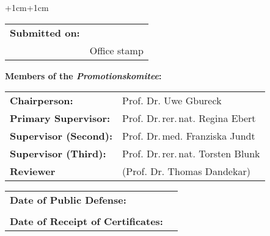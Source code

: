 


\vspace*{\fill} %

\thispagestyle{empty} %

\begin{adjustwidth}{+1cm}{+1cm} %

    \noindent
    \begin{tabular}{l l}
        \textbf{Submitted on:} & \dotuline{\hspace{10cm}} \\
                               & {\small Office stamp}    \\
    \end{tabular}


    \vspace{\vdouble}
    {\noindent\large \textbf{Members of the \textit{Promotionskomitee}:}}

    \vspace{\vhalf}
    \begin{tabular}{l l}
        \textbf{Chairperson:}         & Prof. Dr. Uwe Gbureck               \\
        \textbf{Primary Supervisor:}  & Prof. Dr.\,rer.\,nat. Regina Ebert  \\
        \textbf{Supervisor (Second):} & Prof. Dr.\,med. Franziska Jundt     \\
        \textbf{Supervisor (Third):}  & Prof. Dr.\,rer.\,nat. Torsten Blunk \\
        \textbf{Reviewer}             & (Prof. Dr. Thomas Dandekar)         \\
    \end{tabular}


    \vspace{\vdouble}
    \noindent
    \begin{tabular}{l l}
        \textbf{Date of Public Defense:}          & \dotuline{\hspace{6.45cm}} \\
                                                  &                            \\
        \textbf{Date of Receipt of Certificates:} & \dotuline{\hspace{6.45cm}} \\
    \end{tabular}

\end{adjustwidth}

